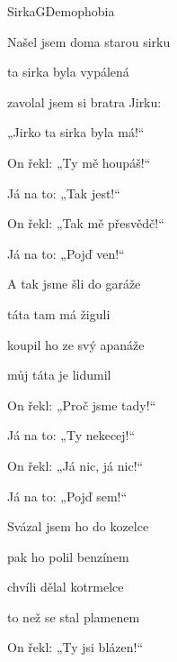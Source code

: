 \setcounter{page}{79}
\begin{song}{Sirka}{G}{Demophobia}

\Ch{[ emi}{}   \Ch{G]}{}

\begin{SBChorus*}

Našel jsem doma starou sirku

ta sirka byla vypálená

zavolal jsem si bratra Jirku:

„Jirko ta sirka byla má!“

\end{SBChorus*}

\begin{SBChorus*}
\begin{itshape}
On řekl: „Ty mě houpáš!“

Já na to: „Tak jest!“

On řekl: „Tak mě přesvědč!“

Já na to: „Pojď ven!“
\end{itshape}
\end{SBChorus*}

\begin{SBChorus*}

A tak jsme šli do garáže

táta tam má žiguli

koupil ho ze svý apanáže

můj táta je lidumil

\end{SBChorus*}

\begin{SBChorus*}
\begin{itshape}
On řekl: „Proč jsme tady!“

Já na to: „Ty nekecej!“

On řekl: „Já nic, já nic!“

Já na to: „Pojď sem!“
\end{itshape}
\end{SBChorus*}

\begin{SBChorus*}

Svázal jsem ho do kozelce

pak ho polil benzínem

chvíli dělal kotrmelce

to než se stal plamenem

\end{SBChorus*}

\begin{SBChorus*}
\begin{itshape}
On řekl: „Ty jsi blázen!“


\end{itshape}
\end{SBChorus*}
\end{song}
